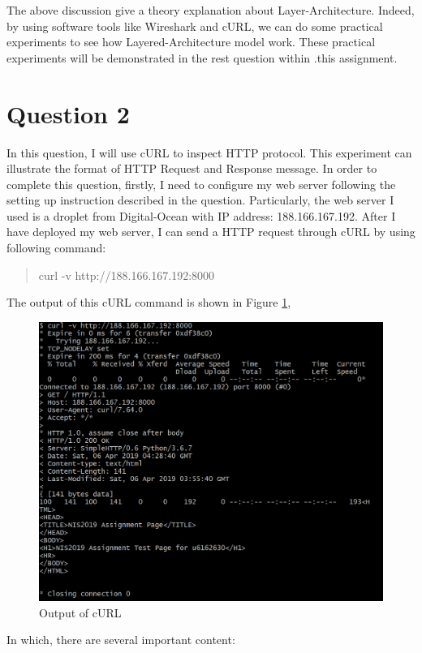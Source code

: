 \documentclass[10pt,a4paper]{article}
\begin{document}
The above discussion give a theory explanation about Layer-Architecture. Indeed, by using software tools like Wireshark and cURL, we can do some practical experiments to see how Layered-Architecture model work. These practical experiments will be demonstrated in the rest question within .this assignment.

\section*{Question 2}
In this question, I will use cURL to inspect HTTP protocol. This experiment can illustrate the format of HTTP Request and Response message. In order to complete this question, firstly, I need to configure my web server following the setting up instruction described in the question. Particularly, the web server I used is a droplet from Digital-Ocean with IP address: 188.166.167.192. After I have deployed my web server, I can send a HTTP request through cURL by using following command:
\begin{quote}
	\center
	curl -v http://188.166.167.192:8000
\end{quote} 
The output of this cURL command is shown in Figure \ref{co},
\begin{figure}[ht]
	\center
	\includegraphics[scale=0.7]{cURL_1}
	\caption{Output of cURL}
	\label{co}
\end{figure}
In which, there are several important content:
\end{document}
